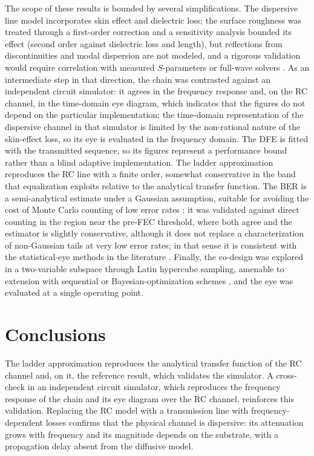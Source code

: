\documentclass[preprint,review,12pt]{elsarticle}
\begin{document}
The scope of these results is bounded by several simplifications. The
dispersive line model incorporates skin effect and dielectric loss; the
surface roughness was treated through a first-order correction and a
sensitivity analysis bounded its effect (second order against dielectric
loss and length), but reflections from discontinuities and modal
dispersion are not modeled, and a rigorous validation would require
correlation with measured $S$-parameters or full-wave solvers
\citep{9134991,5089870}. As an intermediate step in that direction, the
chain was contrasted against an independent circuit simulator: it agrees in
the frequency response and, on the RC channel, in the time-domain eye
diagram, which indicates that the figures do not depend on the particular
implementation; the time-domain representation of the dispersive channel in
that simulator is limited by the non-rational nature of the skin-effect
loss, so its eye is evaluated in the frequency domain. The DFE is fitted
with the transmitted sequence, so its figures represent a performance bound
rather than a blind adaptive implementation. The ladder approximation
reproduces the RC line with a finite order, somewhat conservative in the
band that equalization exploits relative to the analytical transfer
function. The BER is a semi-analytical estimate under a Gaussian
assumption, suitable for avoiding the cost of Monte Carlo counting of low
error rates \citep{6248821}; it was validated against direct counting in the
region near the pre-FEC threshold, where both agree and the estimator is
slightly conservative, although it does not replace a characterization of
non-Gaussian tails at very low error rates; in that sense it is consistent
with the statistical-eye methods in the literature \citep{7202856,10415105}.
Finally, the co-design was explored in a two-variable subspace through
Latin hypercube sampling, amenable to extension with sequential or
Bayesian-optimization schemes \citep{11309336}, and the eye was evaluated at
a single operating point.

\section{Conclusions}
\label{sec:conclusion}

The ladder approximation reproduces the analytical transfer function of the
RC channel and, on it, the reference result, which validates the
simulator. A cross-check in an independent circuit simulator, which
reproduces the frequency response of the chain and its eye diagram over the
RC channel, reinforces this validation. Replacing the RC model with a
transmission line with frequency-dependent losses confirms that the
physical channel is dispersive: its attenuation grows with frequency and
its magnitude depends on the substrate, with a propagation delay absent
from the diffusive model.
\end{document}

